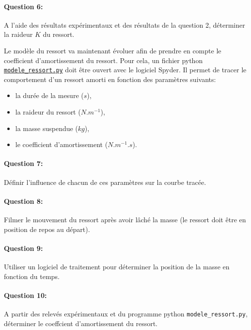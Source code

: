 
\paragraph{Question 6:} A l'aide des résultats expérimentaux et des résultats de la question 2, déterminer la raideur $K$ du ressort.


Le modèle du ressort va maintenant évoluer afin de prendre en compte le coefficient d'amortissement du ressort. Pour cela, un fichier python  
\href{https://github.com/Costadoat/Sciences-Ingenieur/raw/master/S01\%20Analyse\%20fonctionnelle/TP01\%20Mesures\%20physiques/Ilot_03\%20Ressort/modele_ressort.py}{\texttt{modele\_ressort.py}} doit être ouvert avec le logiciel Spyder. Il permet de tracer le comportement d'un ressort amorti en fonction des paramètres suivants:
\begin{itemize}
 \item la durée de la mesure ($s$),
 \item la raideur du ressort ($N.m^{-1}$),
 \item la masse suspendue ($kg$),
 \item le coefficient d'amortissement ($N.m^{-1}.s$).
\end{itemize}

\paragraph{Question 7:} Définir l'influence de chacun de ces paramètres sur la courbe tracée.


\paragraph{Question 8:} Filmer le mouvement du ressort après avoir lâché la masse (le ressort doit être en position de repos au départ).

\paragraph{Question 9:} Utiliser un logiciel de traitement pour déterminer la position de la masse en fonction du temps.


\paragraph{Question 10:} A partir des relevés expérimentaux et du programme python \verb?modele_ressort.py?, déterminer le coeffcient d'amortissement du ressort.


